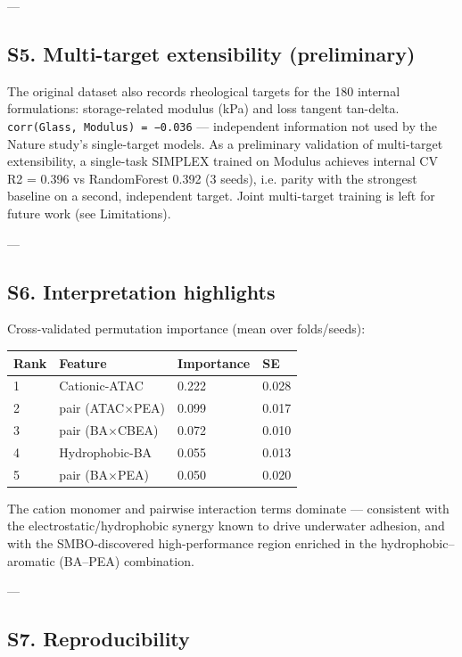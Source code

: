 \documentclass[utf8]{frontiers_suppmat}
\begin{document}
---

\subsection{S5. Multi-target extensibility (preliminary)}

The original dataset also records rheological targets for the 180 internal
formulations: storage-related modulus (kPa) and loss tangent tan-delta.
\texttt{corr(Glass, Modulus) = −0.036} — independent information not used by the
Nature study's single-target models. As a preliminary validation of
multi-target extensibility, a single-task SIMPLEX trained on Modulus
achieves internal CV R2 = 0.396 vs RandomForest 0.392 (3 seeds), i.e. parity
with the strongest baseline on a second, independent target. Joint
multi-target training is left for future work (see Limitations).

---

\subsection{S6. Interpretation highlights}

Cross-validated permutation importance (mean over folds/seeds):

\begin{tabular}{llll}
\toprule
Rank & Feature & Importance & SE \\
\midrule
1 & Cationic-ATAC & 0.222 & 0.028 \\
2 & pair (ATAC$\times$PEA) & 0.099 & 0.017 \\
3 & pair (BA$\times$CBEA) & 0.072 & 0.010 \\
4 & Hydrophobic-BA & 0.055 & 0.013 \\
5 & pair (BA$\times$PEA) & 0.050 & 0.020 \\
\bottomrule
\end{tabular}


The cation monomer and pairwise interaction terms dominate — consistent
with the electrostatic/hydrophobic synergy known to drive underwater
adhesion, and with the SMBO-discovered high-performance region enriched in
the hydrophobic–aromatic (BA–PEA) combination.

---

\subsection{S7. Reproducibility}
\end{document}
